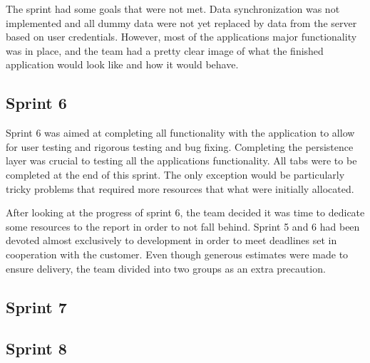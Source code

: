 The sprint had some goals that were not met. Data synchronization was not implemented and all dummy data were not yet replaced by data from the server based on user credentials. However, most of the applications major functionality was in place, and the team had a pretty clear image of what the finished application would look like and how it would behave.

\subsection{Sprint 6}
Sprint 6 was aimed at completing all functionality with the application to allow for user testing and rigorous testing and bug fixing. Completing the persistence layer was crucial to testing all the applications functionality. All tabs were to be completed at the end of this sprint. The only exception would be particularly tricky problems that required more resources that what were initially allocated.

After looking at the progress of sprint 6, the team decided it was time to dedicate some resources to the report in order to not fall behind. Sprint 5 and 6 had been devoted almost exclusively to development in order to meet deadlines set in cooperation with the customer. Even though generous estimates were made to ensure delivery, the team divided into two groups as an extra precaution. 

\subsection{Sprint 7}

\subsection{Sprint 8}
